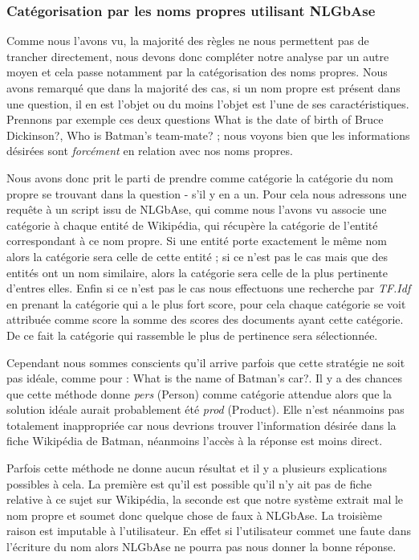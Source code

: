 \documentclass[10pt,a4paper]{article}
\begin{document}
\subsubsection{Catégorisation par les noms propres utilisant NLGbAse}
\par Comme nous l'avons vu, la majorité des règles ne nous permettent pas de trancher directement, nous devons donc compléter notre analyse par un autre moyen et cela passe notamment par la catégorisation des noms propres. Nous avons remarqué que dans la majorité des cas, si un nom propre est présent dans une question, il en est l'objet ou du moins l'objet est l'une de ses caractéristiques. Prennons par exemple ces deux questions \og{}What is the date of birth of Bruce Dickinson?\fg{}, \og{}Who is Batman's team-mate?\fg{} ; nous voyons bien que les informations désirées sont \emph{forcément} en relation avec nos noms propres.
\par Nous avons donc prit le parti de prendre comme catégorie la catégorie du nom propre se trouvant dans la question - s'il y en a un. Pour cela nous adressons une requête à un script issu de NLGbAse, qui comme nous l'avons vu associe une catégorie à chaque entité de Wikipédia, qui récupère la catégorie de l'entité correspondant à ce nom propre. Si une entité porte exactement le même nom alors la catégorie sera celle de cette entité ; si ce n'est pas le cas mais que des entités ont un nom similaire, alors la catégorie sera celle de la plus pertinente d'entres elles. Enfin si ce n'est pas le cas nous effectuons une recherche par \emph{TF.Idf}
en prenant la catégorie qui a le plus fort score, pour cela chaque catégorie se voit attribuée comme score la somme des scores des documents ayant cette catégorie. De ce fait la catégorie qui rassemble le plus de pertinence sera sélectionnée.
\par Cependant nous sommes conscients qu'il arrive parfois que cette stratégie ne soit pas idéale, comme pour : \og{}What is the name of Batman's car?\fg{}. Il y a des chances que cette méthode donne \emph{pers} (Person) comme catégorie attendue alors que la solution idéale aurait probablement été \emph{prod} (Product). Elle n'est néanmoins pas totalement inappropriée car nous devrions trouver l'information désirée dans la fiche Wikipédia de Batman, néanmoins l'accès à la réponse est moins direct.
\par Parfois cette méthode ne donne aucun résultat et il y a plusieurs explications possibles à cela. La première est qu'il est possible qu'il n'y ait pas de fiche relative à ce sujet sur Wikipédia, la seconde est que notre système extrait mal le nom propre et soumet donc quelque chose de faux à NLGbAse. La troisième raison est imputable à l'utilisateur. En effet si l'utilisateur commet une faute dans l'écriture du nom alors NLGbAse ne pourra pas nous donner la bonne réponse. 
\end{document}
